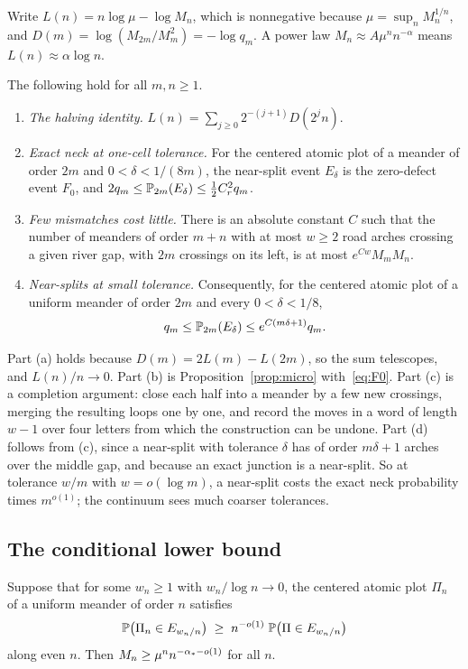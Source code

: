 Write $L(n)=n\log\mu-\log M_n$, which is nonnegative because $\mu=\sup_nM_n^{1/n}$, and
$D(m)=\log(M_{2m}/M_m^2)=-\log q_m$. A power law $M_n\approx A\mu^nn^{-\alpha}$ means
$L(n)\approx\alpha\log n$.

\begin{lemma}\label{lem:transfer}
The following hold for all $m,n\ge1$.
\begin{enumerate}
\item[(a)] \emph{The halving identity.} $L(n)=\sum_{j\ge0}2^{-(j+1)}D(2^jn)$.
\item[(b)] \emph{Exact neck at one-cell tolerance.} For the centered atomic plot of a meander of
order $2m$ and $0<\delta<1/(8m)$, the near-split event $E_\delta$ is the zero-defect event $F_0$,
and $2q_m\le\mathbb{P}_{2m}(E_\delta)\le\frac12C_r^2q_m$.
\item[(c)] \emph{Few mismatches cost little.} There is an absolute constant $C$ such that the number
of meanders of order $m+n$ with at most $w\ge2$ road arches crossing a given river gap, with $2m$
crossings on its left, is at most $e^{Cw}M_mM_n$.
\item[(d)] \emph{Near-splits at small tolerance.} Consequently, for the centered atomic plot of a
uniform meander of order $2m$ and every $0<\delta<1/8$,
\[
q_m\le\mathbb{P}_{2m}(E_\delta)\le e^{C(m\delta+1)}q_m .
\]
\end{enumerate}
\end{lemma}

Part (a) holds because $D(m)=2L(m)-L(2m)$, so the sum telescopes, and $L(n)/n\to0$. Part (b) is
Proposition~\ref{prop:micro} with~\eqref{eq:F0}. Part (c) is a completion argument: close each half
into a meander by a few new crossings, merging the resulting loops one by one, and record the moves
in a word of length $w-1$ over four letters from which the construction can be undone. Part (d) follows from (c), since a near-split
with tolerance $\delta$ has of order $m\delta+1$ arches over the middle gap, and because an exact
junction is a near-split. So at tolerance $w/m$ with $w=o(\log m)$, a near-split costs the exact
neck probability times $m^{o(1)}$; the continuum sees much coarser tolerances.

\subsection{The conditional lower bound}

\begin{proposition}\label{prop:condlower}
Suppose that for some $w_n\ge1$ with $w_n/\log n\to0$, the centered atomic plot $\Pi_n$ of a
uniform meander of order $n$ satisfies
\[
\mathbb{P}\bigl(\Pi_n\in E_{w_n/n}\bigr)\;\ge\;n^{-o(1)}\;\mathbb{P}\bigl(\Pi\in E_{w_n/n}\bigr)
\]
along even $n$. Then $M_n\ge\mu^nn^{-\alpha_*-o(1)}$ for all $n$.
\end{proposition}

